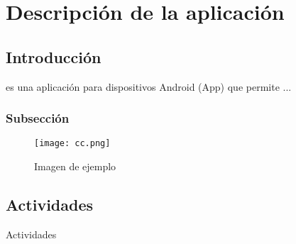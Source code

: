 %
%
%
%

\cleardoublepage

\chapter{Descripción de la aplicación}

\section{Introducción}

\App{} es una aplicación para dispositivos Android (App) que permite ...

\subsection{Subsección}

\begin{figure}[h]
	\centering
	\texttt{[image: cc.png]}
	\caption{Imagen de ejemplo}
	\label{fig:ejemplo}
\end{figure}

\section{Actividades}

Actividades
